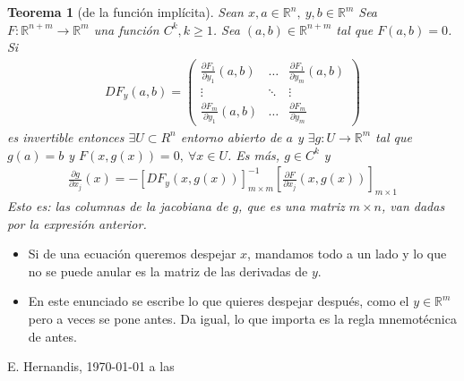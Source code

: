 \documentclass[a4paper,twocolumn]{extarticle}
\newcommand{\R}{\mathbb{R}}
\newtheorem*{thm}{Teorema}
\begin{document}
\begin{thm}[de la función implícita]
	Sean $x,a \in \R^n,\ y,b \in \R^m$
	Sea $F: \R^{n+m} \to \R^m$ una función $C^k, k \geq 1$. Sea $(a,b) \in \R^{n+m}$ tal que $F(a,b) = 0$. Si
	\begin{align*}
		DF_y(a,b) = \left(\begin{array}{ccc}
		\frac{\partial F_1}{\partial y_1}(a,b) & \dots & \frac{\partial F_1}{\partial y_m}(a,b) \\
		\vdots & \ddots & \vdots \\
		\frac{\partial F_m}{\partial y_1}(a,b) & \dots & \frac{\partial F_m}{\partial y_m}
		\end{array}\right)
	\end{align*}
	es invertible entonces $\exists U \subset R^n$ entorno abierto de $a$ y $\exists g:U \to \R^m$ tal que $g(a) = b$ y $F(x, g(x)) = 0,\ \forall x \in U$. Es más, $g \in C^k$ y
	\begin{align*}
		\frac{\partial g}{\partial x_j}(x) = -\left[DF_y(x, g(x))\right]^{-1}_{m\times m}\left[\frac{\partial F}{\partial x_j}(x, g(x))\right]_{m \times 1}
	\end{align*}
	Esto es: las columnas de la jacobiana de $g$, que es una matriz $m \times n$, van dadas por la expresión anterior.
\end{thm}
\begin{itemize}
	\item Si de una ecuación queremos despejar $x$, mandamos todo a un lado y lo que no se puede anular es la matriz de las derivadas de $y$.
	\item En este enunciado se escribe lo que quieres despejar después, como el $y \in \R^m$ pero a veces se pone antes. Da igual, lo que importa es la regla mnemotécnica de antes.
\end{itemize}

\begin{flushright}
	E. Hernandis, \today $ $ a las \currenttime
\end{flushright}
\end{document}
